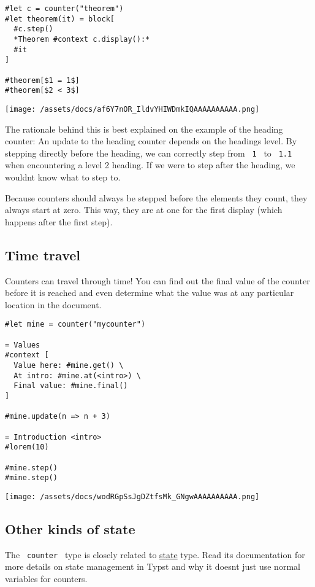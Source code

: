 \begin{verbatim}
#let c = counter("theorem")
#let theorem(it) = block[
  #c.step()
  *Theorem #context c.display():*
  #it
]

#theorem[$1 = 1$]
#theorem[$2 < 3$]
\end{verbatim}

\texttt{[image: /assets/docs/af6Y7nOR\_IldvYHIWDmkIQAAAAAAAAAA.png]}

The rationale behind this is best explained on the example of the
heading counter: An update to the heading counter depends on the
heading\textquotesingle s level. By stepping directly before the
heading, we can correctly step from \texttt{\ 1\ } to \texttt{\ 1.1\ }
when encountering a level 2 heading. If we were to step after the
heading, we wouldn\textquotesingle t know what to step to.

Because counters should always be stepped before the elements they
count, they always start at zero. This way, they are at one for the
first display (which happens after the first step).

\subsection{Time travel}\label{time-travel}

Counters can travel through time! You can find out the final value of
the counter before it is reached and even determine what the value was
at any particular location in the document.

\begin{verbatim}
#let mine = counter("mycounter")

= Values
#context [
  Value here: #mine.get() \
  At intro: #mine.at(<intro>) \
  Final value: #mine.final()
]

#mine.update(n => n + 3)

= Introduction <intro>
#lorem(10)

#mine.step()
#mine.step()
\end{verbatim}

\texttt{[image: /assets/docs/wodRGpSsJgDZtfsMk\_GNgwAAAAAAAAAA.png]}

\subsection{Other kinds of state}\label{other-state}

The \texttt{\ counter\ } type is closely related to
\href{/docs/reference/introspection/state/}{state} type. Read its
documentation for more details on state management in Typst and why it
doesn\textquotesingle t just use normal variables for counters.


